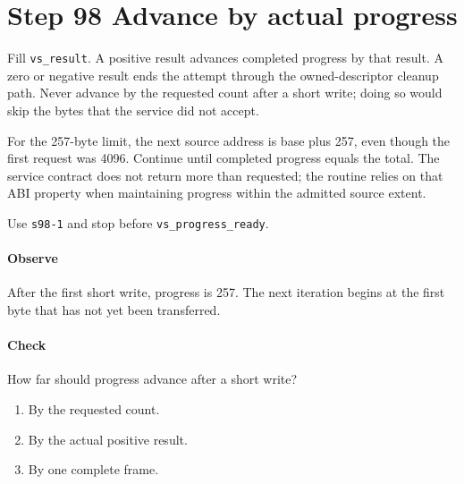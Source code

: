 \section{Step 98 Advance by actual progress}
Fill \texttt{vs\_result}. A positive result advances completed progress by that result. A zero or negative result ends the attempt through the owned-descriptor cleanup path. Never advance by the requested count after a short write; doing so would skip the bytes that the service did not accept.

For the 257-byte limit, the next source address is base plus 257, even though the first request was 4096. Continue until completed progress equals the total. The service contract does not return more than requested; the routine relies on that ABI property when maintaining progress within the admitted source extent.

Use \texttt{s98-1} and stop before \texttt{vs\_progress\_ready}.

\paragraph{Observe} After the first short write, progress is 257. The next iteration begins at the first byte that has not yet been transferred.

\paragraph{Check} How far should progress advance after a short write?
\begin{enumerate}[label=\Alph*.]
  \item By the requested count.
  \item By the actual positive result.
  \item By one complete frame.
\end{enumerate}
